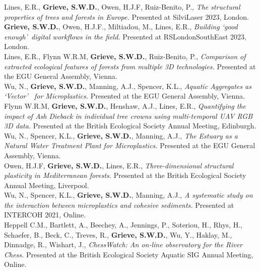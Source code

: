 \documentclass[10pt, a4paper]{article}
\newcommand{\student}{\textbf{\textsuperscript{\textdagger}}}
\newcommand{\years}[1]{\marginnote{\scriptsize #1}}
\begin{document}
\years{2023}Lines, E.R., \textbf{Grieve, S.W.D.}, Owen, H.J.F, Ruiz-Benito, P., \textit{The structural properties of trees and forests in Europe.} Presented at SilviLaser 2023, London.\\[0.05cm]

\years{2023}\textbf{Grieve, S.W.D.}, Owen, H.J.F., Miltiadou, M., Lines, E.R., \textit{Building \lq good enough\rq~digital workflows in the field.} Presented at RSLondonSouthEast 2023, London.\\[0.05cm]

\years{2023} Lines, E.R., Flynn W.R.M\student, \textbf{Grieve, S.W.D.}, Ruiz-Benito, P., \textit{Comparison of extracted ecological features of forests from multiple 3D technologies.} Presented at the EGU General Assembly, Vienna.\\[0.05cm]

\years{2023}Wu, N.\student, \textbf{Grieve, S.W.D.}, Manning, A.J., Spencer, K.L., \textit{Aquatic Aggregates as \lq Vector\rq~ for Microplastics.} Presented at the EGU General Assembly, Vienna.\\[0.05cm]

\years{2022} Flynn W.R.M\student, \textbf{Grieve, S.W.D.}, Henshaw, A.J., Lines, E.R., \textit{Quantifying the impact of Ash Dieback in individual tree crowns using multi-temporal UAV RGB 3D data.} Presented at the British Ecological Society Annual Meeting, Edinburgh.\\[0.05cm]

\years{2022}Wu, N.\student, Spencer, K.L., \textbf{Grieve, S.W.D.}, Manning, A.J., \textit{The Estuary as a Natural Water Treatment Plant for Microplastics.} Presented at the EGU General Assembly, Vienna.\\[0.05cm]

\years{2021}Owen, H.J.F, \textbf{Grieve, S.W.D.}, Lines, E.R., \textit{Three-dimensional structural plasticity in Mediterranean forests.} Presented at the British Ecological Society Annual Meeting, Liverpool.\\[0.05cm]

\years{2021}Wu, N.\student, Spencer, K.L., \textbf{Grieve, S.W.D.}, Manning, A.J., \textit{A systematic study on the interaction between microplastics and cohesive sediments.} Presented at INTERCOH 2021, Online.\\[0.05cm]

\years{2020}Heppell C.M., Bartlett, A., Beechey, A., Jennings, P., Soteriou, H., Rhys, H., Schaefer, B., Beck, C., Treves, R., \textbf{Grieve, S.W.D.}, Wu, Y., Haklay, M., Dinnadge, R., Wishart, J., \textit{ChessWatch: An on-line observatory for the River Chess.} Presented at the British Ecological Society Aquatic SIG Annual Meeting, Online.\\[0.05cm]
\end{document}
